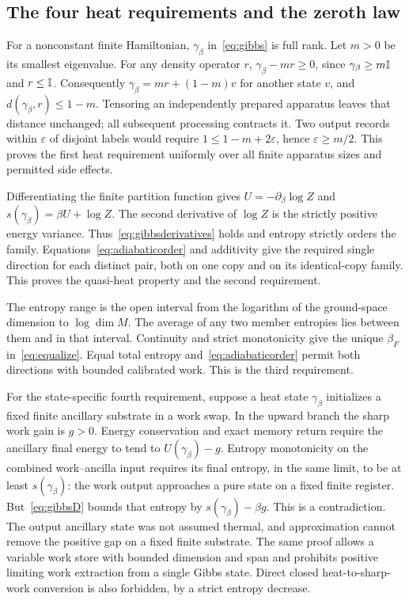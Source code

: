 \subsection{The four heat requirements and the zeroth law}
For a nonconstant finite Hamiltonian, $\gamma_\beta$ in~\eqref{eq:gibbs} is full rank. Let $m>0$ be its smallest eigenvalue. For any density operator $r$, $\gamma_\beta-mr\ge0$, since $\gamma_\beta\ge m\mathbb{I}$ and $r\le\mathbb{I}$. Consequently $\gamma_\beta=mr+(1-m)v$ for another state $v$, and $d(\gamma_\beta,r)\le1-m$. Tensoring an independently prepared apparatus leaves that distance unchanged; all subsequent processing contracts it. Two output records within $\varepsilon$ of disjoint labels would require $1\le1-m+2\varepsilon$, hence $\varepsilon\ge m/2$. This proves the first heat requirement uniformly over all finite apparatus sizes and permitted side effects.

Differentiating the finite partition function gives $U=-\partial_\beta\log Z$ and $s(\gamma_\beta)=\beta U+\log Z$. The second derivative of $\log Z$ is the strictly positive energy variance. Thus~\eqref{eq:gibbsderivatives} holds and entropy strictly orders the family. Equations~\eqref{eq:adiabaticorder} and additivity give the required single direction for each distinct pair, both on one copy and on its identical-copy family. This proves the quasi-heat property and the second requirement.

The entropy range is the open interval from the logarithm of the ground-space dimension to $\log\dim M$. The average of any two member entropies lies between them and in that interval. Continuity and strict monotonicity give the unique $\beta_F$ in~\eqref{eq:equalize}. Equal total entropy and~\eqref{eq:adiabaticorder} permit both directions with bounded calibrated work. This is the third requirement.

For the state-specific fourth requirement, suppose a heat state $\gamma_\beta$ initializes a fixed finite ancillary substrate in a work swap. In the upward branch the sharp work gain is $g>0$. Energy conservation and exact memory return require the ancillary final energy to tend to $U(\gamma_\beta)-g$. Entropy monotonicity on the combined work--ancilla input requires its final entropy, in the same limit, to be at least $s(\gamma_\beta)$: the work output approaches a pure state on a fixed finite register. But~\eqref{eq:gibbsD} bounds that entropy by $s(\gamma_\beta)-\beta g$. This is a contradiction. The output ancillary state was not assumed thermal, and approximation cannot remove the positive gap on a fixed finite substrate. The same proof allows a variable work store with bounded dimension and span and prohibits positive limiting work extraction from a single Gibbs state. Direct closed heat-to-sharp-work conversion is also forbidden, by a strict entropy decrease.

